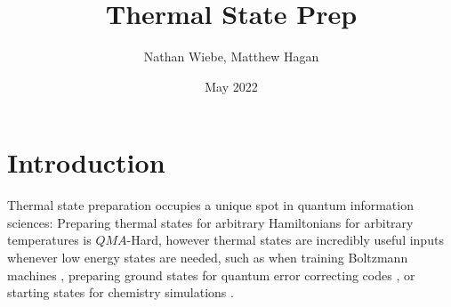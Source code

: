\documentclass{article}
\title{Thermal State Prep}
\author{Nathan Wiebe, Matthew Hagan}
\date{May 2022}
\begin{document}
\maketitle

\section{Introduction}
Thermal state preparation occupies a unique spot in quantum information sciences: Preparing thermal states for arbitrary Hamiltonians for arbitrary temperatures is $QMA$-Hard, however thermal states are incredibly useful inputs whenever low energy states are needed, such as when training Boltzmann machines \cite{}, preparing ground states for quantum error correcting codes \cite{}, or starting states for chemistry simulations \cite{}. 
\end{document}
